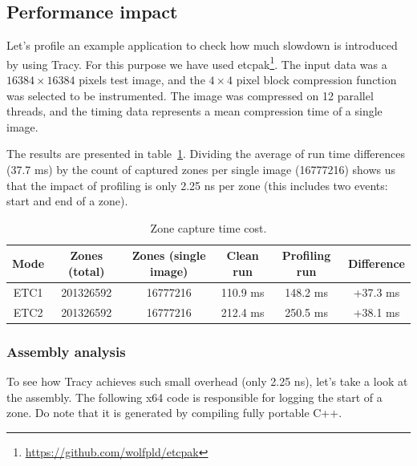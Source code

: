 \documentclass[hidelinks,titlepage,a4paper]{article}
\begin{document}
\subsection{Performance impact}
\label{perfimpact}

Let's profile an example application to check how much slowdown is introduced by using Tracy. For this purpose we have used etcpak\footnote{\url{https://github.com/wolfpld/etcpak}}. The input data was a $16384 \times 16384$ pixels test image, and the $4 \times 4$ pixel block compression function was selected to be instrumented. The image was compressed on 12 parallel threads, and the timing data represents a mean compression time of a single image.

The results are presented in table~\ref{PerformanceImpact}. Dividing the average of run time differences (37.7 \si{\milli\second}) by the count of captured zones per single image (\num{16777216}) shows us that the impact of profiling is only 2.25 \si{\nano\second} per zone (this includes two events: start and end of a zone).

\begin{table}[h]
\centering
\begin{tabular}[h]{c|c|c|c|c|c}
\textbf{Mode} & \textbf{Zones (total)} & \textbf{Zones (single image)} & \textbf{Clean run} & \textbf{Profiling run} & \textbf{Difference} \\ \hline
ETC1 & \num{201326592} & \num{16777216} & 110.9 \si{\milli\second} & 148.2 \si{\milli\second} & +37.3 \si{\milli\second} \\
ETC2 & \num{201326592} & \num{16777216} & 212.4 \si{\milli\second} & 250.5 \si{\milli\second} & +38.1 \si{\milli\second}
\end{tabular}
\caption{Zone capture time cost.}
\label{PerformanceImpact}
\end{table}

\subsubsection{Assembly analysis}

To see how Tracy achieves such small overhead (only 2.25 \si{\nano\second}), let's take a look at the assembly. The following x64 code is responsible for logging the start of a zone. Do note that it is generated by compiling fully portable C++.
\end{document}

